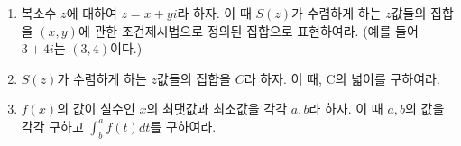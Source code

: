 \documentclass[fleqn]{article}
\begin{document}
\ExamNameLine
{}

\begin{enumerate}
   \item 복소수 $z$에 대하여 $z=x+yi$라 하자. 이 때 $S(z)$가 수렴하게 하는 $z$값들의 집합을 $(x,y)$에 관한 조건제시법으로 정의된 집합으로 표현하여라. (예를 들어 $3+4i$는 $(3, 4)$이다.)
        \noanswer[1in]
   \item $S(z)$가 수렴하게 하는 $z$값들의 집합을 $C$라 하자. 이 때, C의 넓이를 구하여라. 
        \noanswer[1in]
   \item $f(x)$의 값이 실수인 $x$의 최댓값과 최소값을 각각 $a,b$라 하자. 이 때 $a,b$의 값을 각각 구하고 $\int_b^a{f(t)}dt$를 구하여라.
        \noanswer[1in]        

\end{enumerate}
\end{document}
